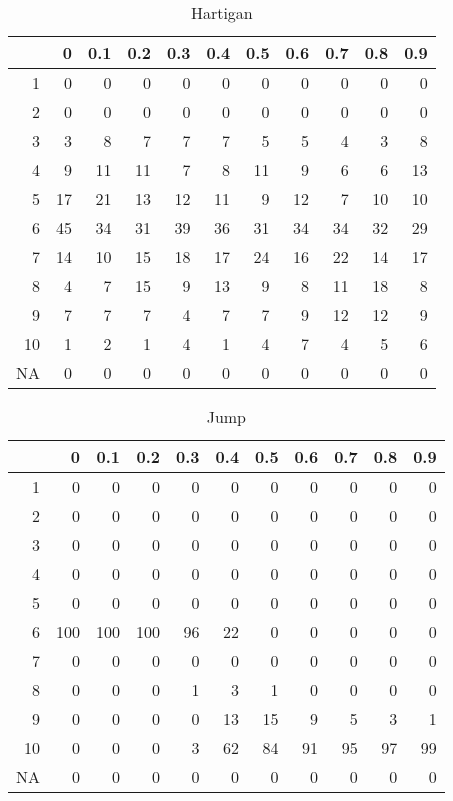 \documentclass[11pt]{article}
\begin{document}
\begin{table}[H]
\centering
\begin{tabular}{rrrrrrrrrrr}
  \hline
 & 0 & 0.1 & 0.2 & 0.3 & 0.4 & 0.5 & 0.6 & 0.7 & 0.8 & 0.9 \\ 
  \hline
1 & 0 & 0 & 0 & 0 & 0 & 0 & 0 & 0 & 0 & 0 \\ 
  2 & 0 & 0 & 0 & 0 & 0 & 0 & 0 & 0 & 0 & 0 \\ 
  3 & 3 & 8 & 7 & 7 & 7 & 5 & 5 & 4 & 3 & 8 \\ 
  4 & 9 & 11 & 11 & 7 & 8 & 11 & 9 & 6 & 6 & 13 \\ 
  5 & 17 & 21 & 13 & 12 & 11 & 9 & 12 & 7 & 10 & 10 \\ 
  6 & 45 & 34 & 31 & 39 & 36 & 31 & 34 & 34 & 32 & 29 \\ 
  7 & 14 & 10 & 15 & 18 & 17 & 24 & 16 & 22 & 14 & 17 \\ 
  8 & 4 & 7 & 15 & 9 & 13 & 9 & 8 & 11 & 18 & 8 \\ 
  9 & 7 & 7 & 7 & 4 & 7 & 7 & 9 & 12 & 12 & 9 \\ 
  10 & 1 & 2 & 1 & 4 & 1 & 4 & 7 & 4 & 5 & 6 \\ 
  NA & 0 & 0 & 0 & 0 & 0 & 0 & 0 & 0 & 0 & 0 \\ 
   \hline
\end{tabular}
\caption{Hartigan} 
\end{table}
\begin{table}[H]
\centering
\begin{tabular}{rrrrrrrrrrr}
  \hline
 & 0 & 0.1 & 0.2 & 0.3 & 0.4 & 0.5 & 0.6 & 0.7 & 0.8 & 0.9 \\ 
  \hline
1 & 0 & 0 & 0 & 0 & 0 & 0 & 0 & 0 & 0 & 0 \\ 
  2 & 0 & 0 & 0 & 0 & 0 & 0 & 0 & 0 & 0 & 0 \\ 
  3 & 0 & 0 & 0 & 0 & 0 & 0 & 0 & 0 & 0 & 0 \\ 
  4 & 0 & 0 & 0 & 0 & 0 & 0 & 0 & 0 & 0 & 0 \\ 
  5 & 0 & 0 & 0 & 0 & 0 & 0 & 0 & 0 & 0 & 0 \\ 
  6 & 100 & 100 & 100 & 96 & 22 & 0 & 0 & 0 & 0 & 0 \\ 
  7 & 0 & 0 & 0 & 0 & 0 & 0 & 0 & 0 & 0 & 0 \\ 
  8 & 0 & 0 & 0 & 1 & 3 & 1 & 0 & 0 & 0 & 0 \\ 
  9 & 0 & 0 & 0 & 0 & 13 & 15 & 9 & 5 & 3 & 1 \\ 
  10 & 0 & 0 & 0 & 3 & 62 & 84 & 91 & 95 & 97 & 99 \\ 
  NA & 0 & 0 & 0 & 0 & 0 & 0 & 0 & 0 & 0 & 0 \\ 
   \hline
\end{tabular}
\caption{Jump} 
\end{table}
\end{document}
